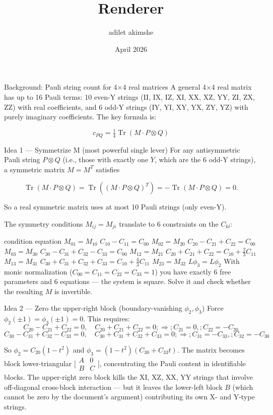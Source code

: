 \documentclass{article}
\title{Renderer}
\author{adilet akimshe}
\date{April 2026}
\begin{document}
Background: Pauli string count for 4×4 real matrices
A general 4×4 real matrix has up to 16 Pauli terms: 10 even-Y strings (II, IX, IZ, XI, XX, XZ, YY, ZI, ZX, ZZ) with real coefficients, and 6 odd-Y strings (IY, YI, XY, YX, ZY, YZ) with purely imaginary coefficients. The key formula is:

$$c_{PQ} = \tfrac{1}{4}\operatorname{Tr}(M \cdot P{\otimes}Q)$$

Idea 1 — Symmetrize M (most powerful single lever)
For any antisymmetric Pauli string $P{\otimes}Q$ (i.e., those with exactly one $Y$, which are the 6 odd-Y strings), a symmetric matrix $M = M^T$ satisfies

$$\operatorname{Tr}(M \cdot P{\otimes}Q) = \operatorname{Tr}((M \cdot P{\otimes}Q)^T) = -\operatorname{Tr}(M \cdot P{\otimes}Q) = 0.$$

So a real symmetric matrix uses at most 10 Pauli strings (only even-Y).

The symmetry conditions $M_{ij} = M_{ji}$ translate to 6 constraints on the $C_{kl}$:

condition	equation
$M_{01}=M_{10}$	$C_{10} - C_{11} = C_{00}$
$M_{02}=M_{20}$	$C_{20} - C_{21} + C_{22} = C_{00}$
$M_{03}=M_{30}$	$C_{30} - C_{31} + C_{32} - C_{33} = C_{00}$
$M_{12}=M_{21}$	$C_{20}+C_{21}+C_{22} = C_{10}+\tfrac{2}{3}C_{11}$
$M_{13}=M_{31}$	$C_{30}+C_{31}+C_{32}+C_{33} = C_{10}+\tfrac{4}{3}C_{11}$
$M_{23}=M_{32}$	$L\phi_3 = L\phi_2$
With monic normalization ($C_{00}=C_{11}=C_{22}=C_{33}=1$) you have exactly 6 free parameters and 6 equations — the system is square. Solve it and check whether the resulting $M$ is invertible.

Idea 2 — Zero the upper-right block (boundary-vanishing $\phi_2, \phi_3$)
Force $\phi_2(\pm 1) = \phi_3(\pm 1) = 0$. This requires:
$$C_{20}-C_{21}+C_{22}=0,\quad C_{20}+C_{21}+C_{22}=0 ;\Rightarrow; C_{21}=0,; C_{22}=-C_{20}$$
$$C_{30}-C_{31}+C_{32}-C_{33}=0,\quad C_{30}+C_{31}+C_{32}+C_{33}=0 ;\Rightarrow; C_{31}=-C_{33},; C_{32}=-C_{30}$$

So $\phi_2 = C_{20}(1-t^2)$ and $\phi_3 = (1-t^2)(C_{30}+C_{33}t)$. The matrix becomes block lower-triangular $\bigl[\begin{smallmatrix}A & 0 \\ B & C\end{smallmatrix}\bigr]$, concentrating the Pauli content in identifiable blocks. The upper-right zero block kills the XI, XZ, XX, YY strings that involve off-diagonal cross-block interaction — but it leaves the lower-left block $B$ (which cannot be zero by the document's argument) contributing its own X- and Y-type strings.
\end{document}
